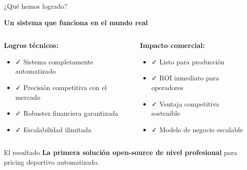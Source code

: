 \documentclass[aspectratio=169]{beamer}
\begin{document}
\begin{frame}{¿Qué hemos logrado?}
\begin{center}
\Large \textcolor{azulprincipai}{\textbf{Un sistema que funciona en el mundo real}}
\end{center}

\vspace{0.5cm}
\begin{columns}
\begin{column}{0.5\textwidth}
\textbf{Logros técnicos:}
\begin{itemize}
\item \textcolor{verdepositivo}{✓} Sistema completamente automatizado
\item \textcolor{verdepositivo}{✓} Precisión competitiva con el mercado
\item \textcolor{verdepositivo}{✓} Robustez financiera garantizada
\item \textcolor{verdepositivo}{✓} Escalabilidad ilimitada
\end{itemize}
\end{column}
\begin{column}{0.5\textwidth}
\textbf{Impacto comercial:}
\begin{itemize}
\item \textcolor{azulprincipai}{✓} Listo para producción
\item \textcolor{azulprincipai}{✓} ROI inmediato para operadores
\item \textcolor{azulprincipai}{✓} Ventaja competitiva sostenible
\item \textcolor{azulprincipai}{✓} Modelo de negocio escalable
\end{itemize}
\end{column}
\end{columns}

\vspace{0.5cm}
\begin{alertblock}{El resultado}
\textbf{La primera solución open-source de nivel profesional} para pricing deportivo automatizado.
\end{alertblock}
\end{frame}
\end{document}
